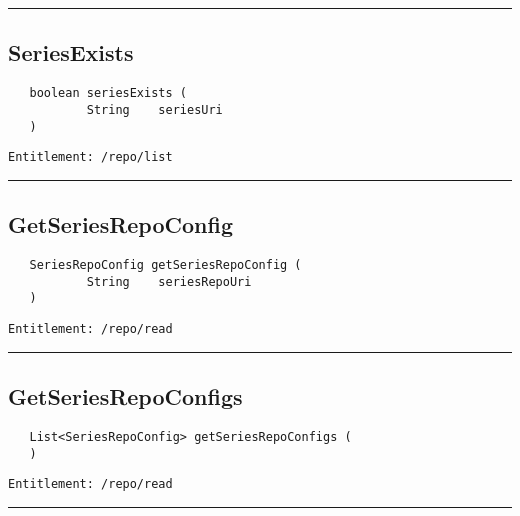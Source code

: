 \rule{12cm}{2pt}
\subsection{SeriesExists}
\label{Api:SeriesExists}
\begin{Verbatim}
   boolean seriesExists (
           String    seriesUri
   )
\end{Verbatim}
\begin{Verbatim}[formatcom=\color{Maroon}]
  Entitlement: /repo/list
\end{Verbatim}



\rule{12cm}{2pt}
\subsection{GetSeriesRepoConfig}
\label{Api:GetSeriesRepoConfig}
\begin{Verbatim}
   SeriesRepoConfig getSeriesRepoConfig (
           String    seriesRepoUri
   )
\end{Verbatim}
\begin{Verbatim}[formatcom=\color{Maroon}]
  Entitlement: /repo/read
\end{Verbatim}



\rule{12cm}{2pt}
\subsection{GetSeriesRepoConfigs}
\label{Api:GetSeriesRepoConfigs}
\begin{Verbatim}
   List<SeriesRepoConfig> getSeriesRepoConfigs (
   )
\end{Verbatim}
\begin{Verbatim}[formatcom=\color{Maroon}]
  Entitlement: /repo/read
\end{Verbatim}



\rule{12cm}{2pt}
